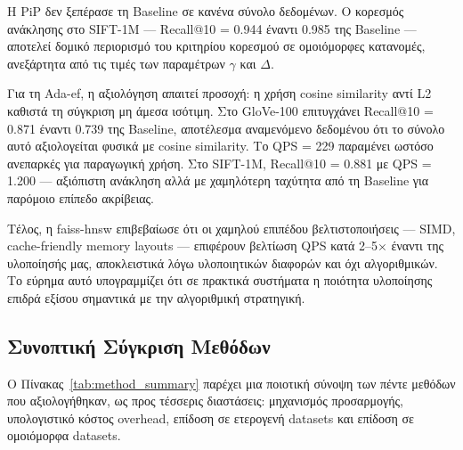 \documentclass[12pt,a4paper]{article}
\begin{document}
Η PiP δεν ξεπέρασε τη Baseline σε κανένα σύνολο δεδομένων. Ο κορεσμός ανάκλησης στο SIFT-1M --- Recall@10 = 0.944 έναντι 0.985 της Baseline --- αποτελεί δομικό περιορισμό του κριτηρίου κορεσμού σε ομοιόμορφες κατανομές, ανεξάρτητα από τις τιμές των παραμέτρων $\gamma$ και $\Delta$.

Για τη Ada-ef, η αξιολόγηση απαιτεί προσοχή: η χρήση cosine similarity αντί L2 καθιστά τη σύγκριση μη άμεσα ισότιμη. Στο GloVe-100 επιτυγχάνει Recall@10 = 0.871 έναντι 0.739 της Baseline, αποτέλεσμα αναμενόμενο δεδομένου ότι το σύνολο αυτό αξιολογείται φυσικά με cosine similarity. Το QPS = 229 παραμένει ωστόσο ανεπαρκές για παραγωγική χρήση. Στο SIFT-1M, Recall@10 = 0.881 με QPS = 1.200 --- αξιόπιστη ανάκληση αλλά με χαμηλότερη ταχύτητα από τη Baseline για παρόμοιο επίπεδο ακρίβειας.

Τέλος, η faiss-hnsw επιβεβαίωσε ότι οι χαμηλού επιπέδου βελτιστοποιήσεις --- SIMD, cache-friendly memory layouts --- επιφέρουν βελτίωση QPS κατά 2--5$\times$ έναντι της υλοποίησής μας, αποκλειστικά λόγω υλοποιητικών διαφορών και όχι αλγοριθμικών. Το εύρημα αυτό υπογραμμίζει ότι σε πρακτικά συστήματα η ποιότητα υλοποίησης επιδρά εξίσου σημαντικά με την αλγοριθμική στρατηγική.

\subsection{Συνοπτική Σύγκριση Μεθόδων}

Ο Πίνακας~\ref{tab:method_summary} παρέχει μια ποιοτική σύνοψη των πέντε μεθόδων που αξιολογήθηκαν, ως προς τέσσερις διαστάσεις: μηχανισμός προσαρμογής, υπολογιστικό κόστος overhead, επίδοση σε ετερογενή datasets και επίδοση σε ομοιόμορφα datasets.
\end{document}
